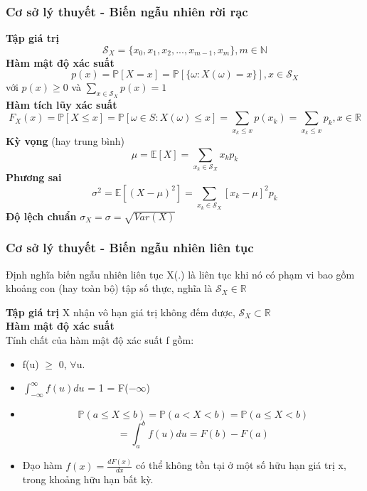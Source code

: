 \documentclass[t]{beamer}
\begin{document}

\begin{frame}[t]
\frametitle{Cơ sở lý thuyết - Biến ngẫu nhiên rời rạc}
\textbf{Tập giá trị} 
\[
\mathcal{S}_X = \{x_0, x_1, x_2, ..., x_{m-1}, x_m\}, m \in \mathbb{N}
\]
\textbf{Hàm mật độ xác suất}\\
\[
p(x) = \mathbb{P}[X=x]= \mathbb{P}[\{\omega: X(\omega)=x\}], x \in \mathcal{S}_X
\]
với $p(x) \geq 0$ và $\sum_{x \in \mathcal{S}_X} p(x) = 1$\\
\textbf{Hàm tích lũy xác suất}
\[
F_{X}(x) = \mathbb{P}[X\leq x] = \mathbb{P}[{\omega \in S: X(\omega) \leq x}]=\sum_{x_k\leq x} p(x_k)
 = \sum_{x_k\leq x} p_k,   x \in \mathbb{R}
\] 
\textbf{Kỳ vọng} (hay trung bình)
\[
\mu = \mathbb{E}[X] = \sum_{x_k \in \mathcal{S}_X} x_k p_k
\]
\textbf{Phương sai}
\[
\sigma^2 = \mathbb{E}[(X-\mu)^2] = \sum_{x_k \in \mathcal{S}_X} [x_k - \mu]^2 p_k
\]
\textbf{Độ lệch chuẩn} $\sigma_{X} = \sigma = \sqrt{Var(X)}$
\end{frame}


\begin{frame}[t]
\frametitle{Cơ sở lý thuyết - Biến ngẫu nhiên liên tục}
\begin{block}{Định nghĩa biến ngẫu nhiên liên tục}
X(.) là liên tục khi nó có phạm vi bao gồm khoảng con (hay toàn bộ) tập số thực, nghĩa là $\mathcal{S}_X \in \mathbb{R}$
\end{block}
\textbf{Tập giá trị} X nhận vô hạn giá trị không đếm được, $\mathcal{S}_X \subset \mathbb{R}$\\
\textbf{Hàm mật độ xác suất}\\
Tính chất của hàm mật độ xác suất f gồm:
\begin{itemize}
\item f(u) $\geq$ 0, $\forall$u.
\item $\int_{-\infty}^{\infty} f(u)du$ = 1 = F($-\infty$)
\item 
\[
\mathbb{P}(a \leq X \leq b) = \mathbb{P}(a < X < b) = \mathbb{P}(a \leq X < b)
\]
\[
 = \int_{a}^{b} f(u)du = F(b) - F(a)
\]
\item Đạo hàm $f(x) = \frac{dF(x)}{dx}$ có thể không tồn tại ở một số hữu hạn giá trị x, trong khoảng hữu hạn bất kỳ.   
\end{itemize}
\end{frame}

\end{document}
